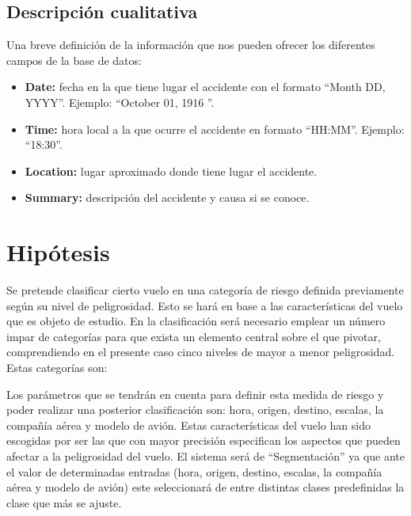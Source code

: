 \documentclass[a4paper,10pt]{article}
\begin{document}
\subsection{Descripci\'on cualitativa}
Una breve definici\'on de la informaci\'on que nos pueden ofrecer los diferentes campos de la base de datos:
\begin{itemize}
\item \textbf{Date:} fecha en la que tiene lugar el accidente con el formato ``Month DD, YYYY''. Ejemplo: ``October 01, 1916 ''.
\item \textbf{Time:} hora local a la que ocurre el accidente en formato ``HH:MM''. Ejemplo: ``18:30''.
\item \textbf{Location:} lugar aproximado  donde tiene lugar el accidente.
\item \textbf{Summary:} descripci\'on del accidente y causa si se conoce.
\end{itemize}


\section{Hip\'otesis}
Se pretende clasificar cierto vuelo en una categor\'ia de riesgo definida previamente seg\'un su nivel de peligrosidad. Esto se har\'a en base a las caracter\'isticas del vuelo que es objeto de estudio.
\singlespacing
En la clasificaci\'on ser\'a necesario emplear un n\'umero impar de categor\'ias para que exista un elemento central sobre el que pivotar, comprendiendo en el presente caso cinco niveles de mayor a menor peligrosidad. Estas categor\'ias son:



\pagebreak
	Los par\'ametros que se tendr\'an en cuenta para definir esta medida de riesgo y poder realizar una posterior clasificaci\'on son: hora, origen, destino, escalas, la compa\~n\'ia a\'erea y modelo de avi\'on.
    \singlespacing
	Estas caracter\'isticas del vuelo han sido escogidas por ser las que con mayor precisi\'on especifican los aspectos que pueden afectar a la peligrosidad del vuelo.
    \singlespacing
	El sistema ser\'a de ``Segmentaci\'on'' ya que ante el valor de determinadas entradas (hora, origen, destino, escalas, la compa\~n\'ia a\'erea y modelo de avi\'on) este seleccionar\'a de entre distintas clases predefinidas la clase que m\'as se ajuste.
\end{document}
